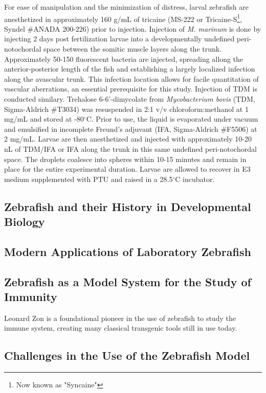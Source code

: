 For ease of manipulation and the minimization of distress, larval zebrafish are anesthetized in approximately 160 \textmu g/mL of tricaine (MS-222 or Tricaine-S\footnote{Now known as "Syncaine"}, Syndel \#ANADA 200-226) prior to injection. Injection of \textit{M. marinum} is done by injecting 2 days post fertilization larvae into a developmentally undefined peri-notochordal space between the somitic muscle layers along the trunk. Approximately 50-150 fluorescent bacteria are injected, spreading allong the anterior-posterior length of the fish and establishing a largely localized infection along the avascular trunk. This infection location allows for facile quantitation of vascular aberrations, an essential prerequisite for this study. Injection of TDM is conducted similary. Trehalose 6-6'-dimycolate from \textit{Mycobacterium bovis} (TDM, Sigma-Aldrich \#T3034) was resuspended in 2:1 v/v chloroform:methanol at 1 mg/mL and stored at -80$^{\circ}$C. Prior to use, the liquid is evaporated under vacuum and emulsified in incomplete Freund's adjuvant (IFA, Sigma-Aldrich \#F5506) at 2 mg/mL. Larvae are then anesthetized and injected with approximately 10-20 nL of TDM/IFA or IFA along the trunk in this same undefined peri-notochordal space. The droplets coalesce into spheres within 10-15 minutes and remain in place for the entire experimental duration. Larvae are allowed to recover in E3 medium supplemented with PTU and raised in a 28.5$^{\circ}$C incubator.

\subsection{Zebrafish and their History in Developmental Biology}

\subsection{Modern Applications of Laboratory Zebrafish}

\subsection{Zebrafish as a Model System for the Study of Immunity}

Leonard Zon is a foundational pioneer in the use of zebrafish to study the immune system, creating many classical transgenic tools still in use today.

\subsection{Challenges in the Use of the Zebrafish Model}

